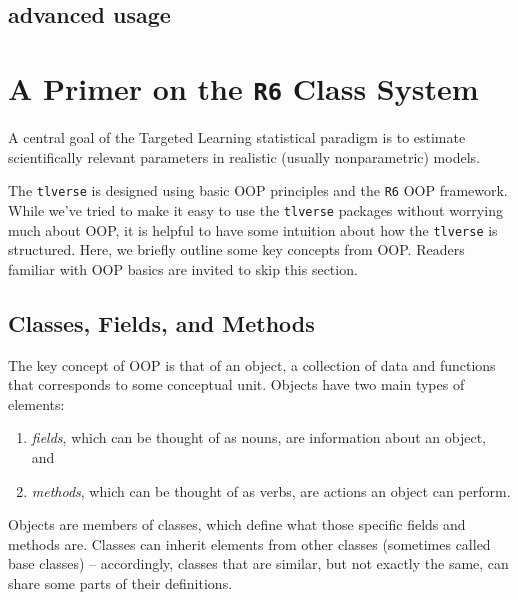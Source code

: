 \documentclass[
  12pt, krantz2,
]{krantz}
\newcommand{\passthrough}[1]{#1}
\providecommand{\tightlist}{%
  \setlength{\itemsep}{0pt}\setlength{\parskip}{0pt}}
\theoremstyle{definition}
\theoremstyle{definition}
\theoremstyle{definition}
\newcommand{\1}{\mathbbm{1}}
\begin{document}
\hypertarget{advanced-usage-2}{%
\section{advanced usage}\label{advanced-usage-2}}

\hypertarget{r6}{%
\chapter{\texorpdfstring{A Primer on the \texttt{R6} Class System}{A Primer on the R6 Class System}}\label{r6}}

A central goal of the Targeted Learning statistical paradigm is to estimate
scientifically relevant parameters in realistic (usually nonparametric) models.

The \passthrough{\lstinline!tlverse!} is designed using basic OOP principles and the \passthrough{\lstinline!R6!} OOP framework.
While we've tried to make it easy to use the \passthrough{\lstinline!tlverse!} packages without worrying
much about OOP, it is helpful to have some intuition about how the \passthrough{\lstinline!tlverse!} is
structured. Here, we briefly outline some key concepts from OOP. Readers
familiar with OOP basics are invited to skip this section.

\hypertarget{classes-fields-and-methods}{%
\section{Classes, Fields, and Methods}\label{classes-fields-and-methods}}

The key concept of OOP is that of an object, a collection of data and functions
that corresponds to some conceptual unit. Objects have two main types of
elements:

\begin{enumerate}
\def\labelenumi{\arabic{enumi}.}
\tightlist
\item
  \emph{fields}, which can be thought of as nouns, are information about an object,
  and
\item
  \emph{methods}, which can be thought of as verbs, are actions an object can
  perform.
\end{enumerate}

Objects are members of classes, which define what those specific fields and
methods are. Classes can inherit elements from other classes (sometimes called
base classes) -- accordingly, classes that are similar, but not exactly the
same, can share some parts of their definitions.
\end{document}
